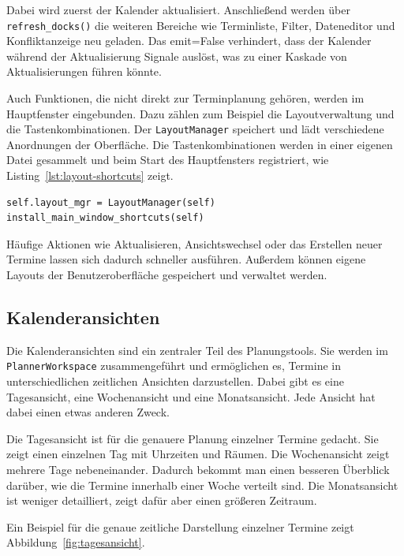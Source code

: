 \documentclass[12pt,a4paper]{article}
\begin{document}
Dabei wird zuerst der Kalender aktualisiert. Anschließend werden über \texttt{refresh\_docks()} die weiteren Bereiche wie Terminliste, Filter, Dateneditor und Konfliktanzeige neu geladen.
Das emit=False verhindert, dass der Kalender während der Aktualisierung Signale auslöst, was zu einer Kaskade von Aktualisierungen führen könnte.

Auch Funktionen, die nicht direkt zur Terminplanung gehören, werden im Hauptfenster eingebunden. Dazu zählen zum Beispiel die Layoutverwaltung und die Tastenkombinationen. Der \texttt{LayoutManager} speichert und lädt verschiedene Anordnungen der Oberfläche. Die Tastenkombinationen werden in einer eigenen Datei gesammelt und beim Start des Hauptfensters registriert, wie Listing~\ref{lst:layout-shortcuts} zeigt.

\begin{lstlisting}[caption={Initialisierung von Layoutverwaltung und Shortcuts}, label={lst:layout-shortcuts}]
self.layout_mgr = LayoutManager(self)
install_main_window_shortcuts(self)
\end{lstlisting}

Häufige Aktionen wie Aktualisieren, Ansichtswechsel oder das Erstellen neuer Termine lassen sich dadurch schneller ausführen. Außerdem können eigene Layouts der Benutzeroberfläche gespeichert und verwaltet werden.

\subsection{Kalenderansichten}

Die Kalenderansichten sind ein zentraler Teil des Planungstools. Sie werden im \texttt{PlannerWorkspace} zusammengeführt und ermöglichen es, Termine in unterschiedlichen zeitlichen Ansichten darzustellen. Dabei gibt es eine Tagesansicht, eine Wochenansicht und eine Monatsansicht. Jede Ansicht hat dabei einen etwas anderen Zweck.

Die Tagesansicht ist für die genauere Planung einzelner Termine gedacht. Sie zeigt einen einzelnen Tag mit Uhrzeiten und Räumen. Die Wochenansicht zeigt mehrere Tage nebeneinander. Dadurch bekommt man einen besseren Überblick darüber, wie die Termine innerhalb einer Woche verteilt sind. Die Monatsansicht ist weniger detailliert, zeigt dafür aber einen größeren Zeitraum.

Ein Beispiel für die genaue zeitliche Darstellung einzelner Termine zeigt Abbildung~\ref{fig:tagesansicht}.
\end{document}
